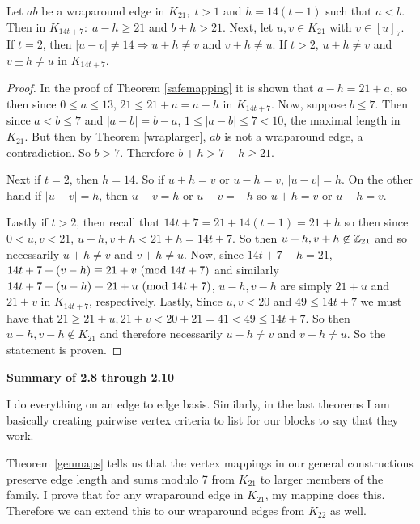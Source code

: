 \begin{corollary}\label{newvertices}
    Let $ab$ be a wraparound edge in $K_{21},\;t>1$ and $h=14(t-1)$ such that $a<b$. Then in $K_{14t+7}:\;a-h\geq 21$ and $b+h>21$. Next, let $u,v\in K_{21}$ with $v\in [u]_{7}$. If $t=2$, then $|u-v|\neq 14\Rightarrow u\pm h\neq v$ and $v\pm h \neq u$. If $t>2$, $u\pm h\neq v$ and $v\pm h\neq u$ in $K_{14t+7}$.
\end{corollary}
\begin{proof}
    In the proof of Theorem \ref{safemapping} it is shown that $a-h=21+a$, so then since $0\leq a\leq 13$, $21\leq 21+a=a-h$ in $K_{14t+7}$. Now, suppose $b\leq 7$. Then since $a<b\leq 7$ and $|a-b|=b-a$, $1\leq |a-b|\leq 7<10$, the maximal length in $K_{21}$. But then by Theorem \ref{wraplarger}, $ab$ is not a wraparound edge, a contradiction. So $b>7$. Therefore $b+h>7+h\geq 21$.

    Next if $t=2$, then $h=14$. So if $u+h = v$ or $u-h=v$, $|u-v|=h$. On the other hand if $|u-v|=h$, then $u-v=h$ or $u-v=-h$ so $u+h = v$ or $u-h=v$. 

    Lastly if $t>2$, then recall that $14t+7=21+14(t-1)=21+h$ so then since $0<u,v<21$, $u+h,v+h<21+h=14t+7$. So then $u+h,v+h\not\in \mathbb{Z}_{21}$ and so necessarily $u+ h\neq v$ and $v+ h\neq u$. Now, since $14t+7-h=21$, $14t+7+(v-h)\equiv 21+v\ (\mathrm{mod}\ 14t+7)$ and similarly $14t+7+(u-h)\equiv 21+u\ (\mathrm{mod}\ 14t+7)$, $u-h,v-h$ are simply $21+u$ and $21+v$ in $K_{14t+7}$, respectively. Lastly, Since $u,v<20$ and $49\leq 14t+7$ we must have that $21\geq 21+u,21+v<20+21=41<49\leq 14t+7$. So then $u-h,v-h\not\in K_{21}$ and therefore necessarily $u-h\neq v$ and $v-h\neq u$. So the statement is proven.

\end{proof}

\begin{center}
    \textbf{Summary of 2.8 through 2.10}
\end{center}

I do everything on an edge to edge basis. Similarly, in the last theorems I am basically creating pairwise vertex criteria to list for our blocks to say that they work.

Theorem \ref{genmaps} tells us that the vertex mappings in our general constructions preserve edge length and sums modulo 7 from $K_{21}$ to larger members of the family. I prove that for any wraparound edge in $K_{21}$, my mapping does this. Therefore we can extend this to our wraparound edges from $K_{22}$ as well.

